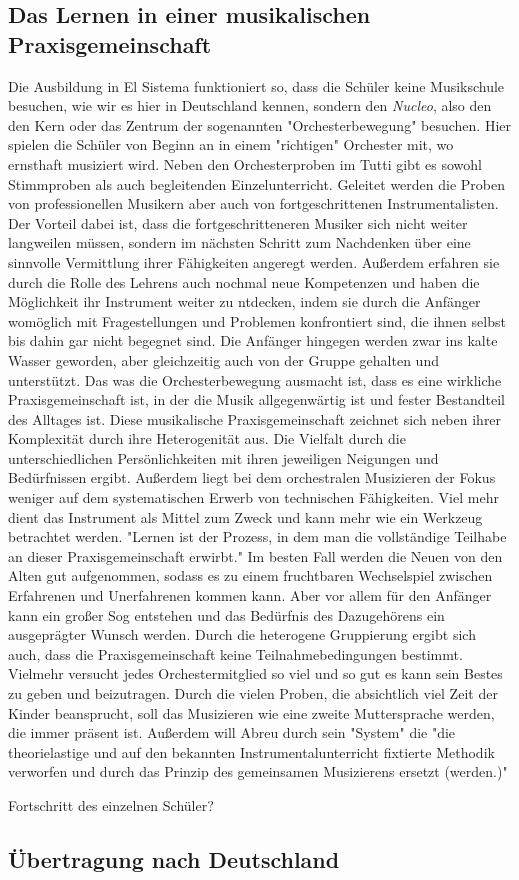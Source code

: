 \subsection{Das Lernen in einer musikalischen Praxisgemeinschaft}
Die Ausbildung in El Sistema funktioniert so, dass die Schüler keine Musikschule
besuchen, wie wir es hier in Deutschland kennen, sondern den \emph{Nucleo}, also
den den Kern oder das Zentrum der sogenannten "Orchesterbewegung" besuchen. Hier
spielen die Schüler von Beginn an in einem "richtigen" Orchester mit, wo
ernsthaft musiziert wird. Neben den Orchesterproben im Tutti gibt es sowohl
Stimmproben als auch begleitenden Einzelunterricht. Geleitet werden die Proben
von professionellen Musikern aber auch von fortgeschrittenen Instrumentalisten.
\autocite[45]{kaufmann:el_sistema} Der Vorteil dabei ist, dass die
fortgeschritteneren Musiker sich nicht weiter langweilen müssen, sondern im
nächsten Schritt zum Nachdenken über eine sinnvolle Vermittlung ihrer
Fähigkeiten angeregt werden. Außerdem erfahren sie durch die Rolle des Lehrens
auch nochmal neue Kompetenzen und haben die Möglichkeit ihr Instrument weiter zu
ntdecken, indem sie durch die Anfänger womöglich mit Fragestellungen und
Problemen konfrontiert sind, die ihnen selbst bis dahin gar nicht begegnet sind.
Die Anfänger hingegen werden zwar ins kalte Wasser geworden, aber gleichzeitig
auch von der Gruppe gehalten und unterstützt.
Das was die Orchesterbewegung ausmacht ist, dass es eine wirkliche
Praxisgemeinschaft ist, in der die Musik allgegenwärtig ist und fester
Bestandteil des Alltages ist. Diese musikalische Praxisgemeinschaft zeichnet
sich neben ihrer Komplexität durch ihre Heterogenität aus. Die Vielfalt durch
die unterschiedlichen Persönlichkeiten mit ihren jeweiligen Neigungen und
Bedürfnissen ergibt. %
Außerdem liegt bei dem orchestralen Musizieren der Fokus weniger auf dem
systematischen Erwerb von technischen Fähigkeiten. Viel mehr dient das
Instrument als Mittel zum Zweck und kann mehr wie ein Werkzeug betrachtet
werden. "Lernen ist der Prozess, in dem man die vollständige Teilhabe an dieser
Praxisgemeinschaft erwirbt." Im besten Fall werden die Neuen von den Alten gut
aufgenommen, sodass es zu einem fruchtbaren Wechselspiel zwischen Erfahrenen und
Unerfahrenen kommen kann. Aber vor allem für den Anfänger kann ein großer Sog
entstehen und das Bedürfnis des Dazugehörens ein ausgeprägter Wunsch werden.
Durch die heterogene Gruppierung ergibt sich auch, dass die Praxisgemeinschaft
keine Teilnahmebedingungen bestimmt. Vielmehr versucht jedes Orchestermitglied
so viel und so gut es kann sein Bestes zu geben und beizutragen. Durch die
vielen Proben, die absichtlich viel Zeit der Kinder beansprucht, soll das
Musizieren wie eine zweite Muttersprache werden, die immer präsent ist.%
Außerdem will Abreu durch sein "System" die "die theorielastige und auf den
bekannten Instrumentalunterricht fixtierte Methodik verworfen und durch das
Prinzip des gemeinsamen Musizierens ersetzt (werden.)"
\autocite[45]{kaufmann:el_sistema}


Fortschritt des einzelnen Schüler?

\subsection{Übertragung nach Deutschland}

